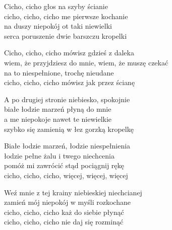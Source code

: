 \begin{text}
    Cicho, cicho głos na szyby ścianie\\
    cicho, cicho, cicho me pierwsze kochanie\\
    na duszy niepokój ot taki niewielki\\
    serca poruszenie dwie barszczu kropelki

    Cicho, cicho, cicho mówisz gdzieś z daleka\\
    wiem, że przyjdziesz do mnie, wiem, że muszę czekać\\
    na to niespełnione, trochę nieudane\\
    cicho, cicho, cicho mówisz jak przez ścianę

    A po drugiej stronie niebiesko, spokojnie\\
    białe łodzie marzeń płyną do mnie\\
    a me niepokoje nawet te niewielkie\\
    szybko się zamienią w łez gorzką kropelkę

    Białe łodzie marzeń, łodzie niespełnienia\\
    łodzie pełne żalu i twego niechcenia\\
    pomóż mi zawrócić stąd pociągnij rękę\\
    cicho, cicho, cicho, więcej, więcej, więcej

    Weź mnie z tej krainy niebieskiej niechcianej\\
    zamień mój niepokój w myśli rozkochane\\
    cicho, cicho, cicho każ do siebie płynąć\\
    cicho, cicho, cicho nie daj się rozminąć
\end{text}
\begin{chord}

\end{chord}